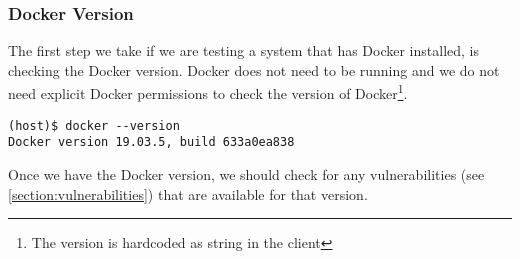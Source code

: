 \subsubsection{Docker Version}
The first step we take if we are testing a system that has Docker installed, is checking the Docker version. Docker does not need to be running and we do not need explicit Docker permissions to check the version of Docker\footnote{The version is hardcoded as string in the client}.

\begin{lstlisting}[caption={Show Docker version.},captionpos=b]
(host)$ docker --version
Docker version 19.03.5, build 633a0ea838
\end{lstlisting}

Once we have the Docker version, we should check for any vulnerabilities (see \autoref{section:vulnerabilities}) that are available for that version.

